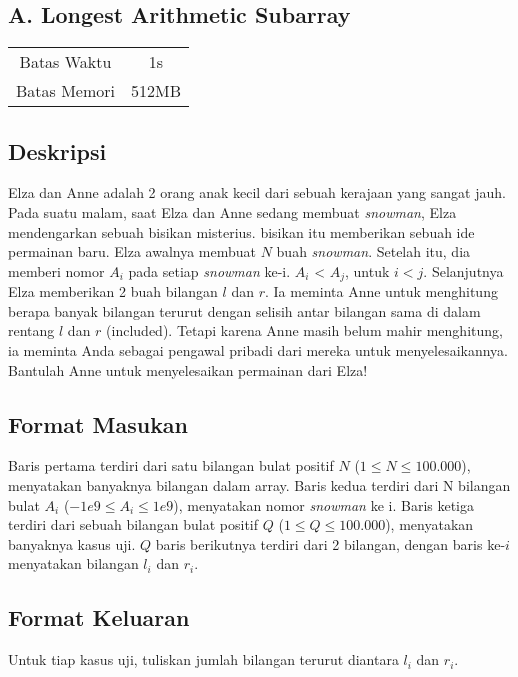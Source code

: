 \documentclass{article}
\begin{document}
\begin{center}
    \section*{A. Longest Arithmetic Subarray} %

    \begin{tabular}{ | c c | }
        \hline
        Batas Waktu  & 1s \\    %
        Batas Memori & 512MB \\  %
        \hline
    \end{tabular}
\end{center}

\subsection*{Deskripsi}

Elza dan Anne adalah 2 orang anak kecil dari sebuah kerajaan yang sangat jauh.
Pada suatu malam, saat Elza dan Anne sedang membuat \textit{snowman}, Elza mendengarkan sebuah bisikan misterius.
bisikan itu memberikan sebuah ide permainan baru. Elza awalnya membuat $N$ buah \textit{snowman}.
Setelah itu, dia memberi nomor $A_i$ pada setiap \textit{snowman} ke-i. $A_i$ < $A_j$, untuk $i < j$.
Selanjutnya Elza memberikan 2 buah bilangan $l$ dan $r$. Ia meminta Anne untuk menghitung berapa banyak bilangan terurut 
dengan selisih antar bilangan sama di dalam rentang $l$ dan $r$ (included).
Tetapi karena Anne masih belum mahir menghitung, ia meminta Anda sebagai pengawal pribadi dari mereka untuk menyelesaikannya.
Bantulah Anne untuk menyelesaikan permainan dari Elza!

\subsection*{Format Masukan}

Baris pertama terdiri dari satu bilangan bulat positif $N$ ($1 \leq N \leq 100.000$), menyatakan banyaknya bilangan dalam array.
Baris kedua terdiri dari N bilangan bulat $A_i$ ($-1e9 \leq A_i \leq 1e9$), menyatakan nomor \textit{snowman} ke i.
Baris ketiga terdiri dari sebuah bilangan bulat positif $Q$ ($1 \leq Q \leq 100.000$), menyatakan banyaknya kasus uji.
$Q$ baris berikutnya terdiri dari 2 bilangan, dengan baris ke-$i$ menyatakan bilangan $l_i$ dan $r_i$.

\subsection*{Format Keluaran}
Untuk tiap kasus uji, tuliskan jumlah bilangan terurut diantara $l_i$ dan $r_i$.
\\
\end{document}
